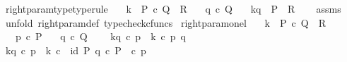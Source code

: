 \begin{isabellebody}
\isamarkupfalse%
%
\endisatagproof
{\isafoldproof}%
%
\isadelimproof
\isanewline
%
\endisadelimproof
\isanewline
{}\isamarkupfalse%
\ right{\isacharunderscore}{\kern0pt}param{\isacharunderscore}{\kern0pt}type{\isacharbrackleft}{\kern0pt}type{\isacharunderscore}{\kern0pt}rule{\isacharbrackright}{\kern0pt}{\isacharcolon}{\kern0pt}\isanewline
\ \ \ {\isachardoublequoteopen}k\ {\isacharcolon}{\kern0pt}\ P\ {\isasymtimes}\isactrlsub c\ Q\ {\isasymrightarrow}\ R{\isachardoublequoteclose}\isanewline
\ \ \ {\isachardoublequoteopen}q\ {\isasymin}\isactrlsub c\ Q{\isachardoublequoteclose}\isanewline
\ \ \ {\isachardoublequoteopen}k\isactrlbsub {\isacharbrackleft}{\kern0pt}{\isacharminus}{\kern0pt}{\isacharcomma}{\kern0pt}q{\isacharbrackright}{\kern0pt}\isactrlesub \ {\isacharcolon}{\kern0pt}\ P\ {\isasymrightarrow}\ R{\isachardoublequoteclose}\isanewline
%
\isadelimproof
\ \ %
\endisadelimproof
%
\isatagproof
{}\isamarkupfalse%
\ assms\ \isamarkupfalse%
\ {\isacharparenleft}{\kern0pt}unfold\ right{\isacharunderscore}{\kern0pt}param{\isacharunderscore}{\kern0pt}def{}{\isacharcomma}{\kern0pt}\ typecheck{\isacharunderscore}{\kern0pt}cfuncs{\isacharparenright}{\kern0pt}%
\endisatagproof
{\isafoldproof}%
%
\isadelimproof
\isanewline
%
\endisadelimproof
\isanewline
{}\isamarkupfalse%
\ right{\isacharunderscore}{\kern0pt}param{\isacharunderscore}{\kern0pt}on{\isacharunderscore}{\kern0pt}el{\isacharcolon}{\kern0pt}\isanewline
\ \ \ {\isachardoublequoteopen}k\ {\isacharcolon}{\kern0pt}\ P\ {\isasymtimes}\isactrlsub c\ Q\ {\isasymrightarrow}\ R{\isachardoublequoteclose}\isanewline
\ \ \ {\isachardoublequoteopen}p\ {\isasymin}\isactrlsub c\ P{\isachardoublequoteclose}\isanewline
\ \ \ {\isachardoublequoteopen}q\ {\isasymin}\isactrlsub c\ Q{\isachardoublequoteclose}\isanewline
\ \ \ \ {\isachardoublequoteopen}k\isactrlbsub {\isacharbrackleft}{\kern0pt}{\isacharminus}{\kern0pt}{\isacharcomma}{\kern0pt}q{\isacharbrackright}{\kern0pt}\isactrlesub \ {\isasymcirc}\isactrlsub c\ p\ {\isacharequal}{\kern0pt}\ k\ {\isasymcirc}\isactrlsub c\ {\isasymlangle}p{\isacharcomma}{\kern0pt}\ q{\isasymrangle}{\isachardoublequoteclose}\isanewline
%
\isadelimproof
%
\endisadelimproof
%
\isatagproof
{}\isamarkupfalse%
\ {\isacharminus}{\kern0pt}\ \isanewline
\ \ \isamarkupfalse%
\ {\isachardoublequoteopen}k\isactrlbsub {\isacharbrackleft}{\kern0pt}{\isacharminus}{\kern0pt}{\isacharcomma}{\kern0pt}q{\isacharbrackright}{\kern0pt}\isactrlesub \ {\isasymcirc}\isactrlsub c\ p\ {\isacharequal}{\kern0pt}\ k\ {\isasymcirc}\isactrlsub c\ \ {\isasymlangle}id\ P{\isacharcomma}{\kern0pt}\ q\ {\isasymcirc}\isactrlsub c\ {\isasymbeta}\isactrlbsub P\isactrlesub {\isasymrangle}\ \ {\isasymcirc}\isactrlsub c\ p{\isachardoublequoteclose}\isanewline

\end{isabellebody}
